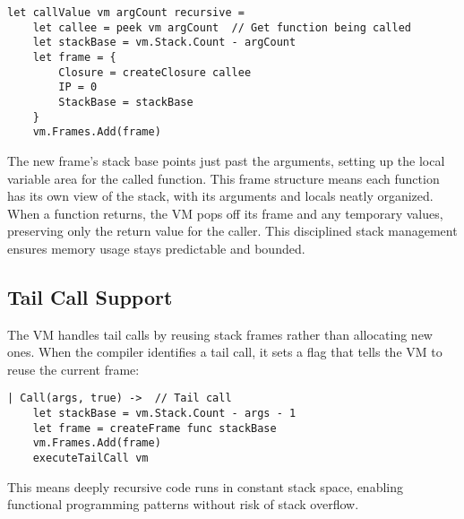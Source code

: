 \begin{verbatim}
let callValue vm argCount recursive =
    let callee = peek vm argCount  // Get function being called
    let stackBase = vm.Stack.Count - argCount
    let frame = {
        Closure = createClosure callee
        IP = 0
        StackBase = stackBase
    }
    vm.Frames.Add(frame)
\end{verbatim}

The new frame's stack base points just past the arguments, setting up the local variable area for the called function.
This frame structure means each function has its own view of the stack, with its arguments and locals neatly organized.
When a function returns, the VM pops off its frame and any temporary values, preserving only the return value for the caller.
This disciplined stack management ensures memory usage stays predictable and bounded.

\subsection{Tail Call Support}\label{subsec:tail-call-support}

The VM handles tail calls by reusing stack frames rather than allocating new ones.
When the compiler identifies a tail call, it sets a flag that tells the VM to reuse the current frame:

\begin{verbatim}
| Call(args, true) ->  // Tail call
    let stackBase = vm.Stack.Count - args - 1
    let frame = createFrame func stackBase
    vm.Frames.Add(frame)
    executeTailCall vm
\end{verbatim}
This means deeply recursive code runs in constant stack space, enabling functional programming patterns without risk of stack overflow.

